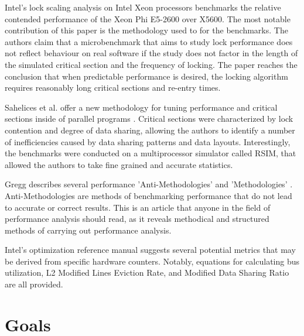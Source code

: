 \documentclass[a4paper, 12pt, titlepage]{article}
\begin{document}
\begin{singlespace}
Intel's lock scaling analysis on Intel Xeon processors \cite{intelxeonlockscaling} benchmarks the relative contended performance of the Xeon Phi E5-2600 over X5600. The most notable contribution of this paper is the methodology used to for the benchmarks. The authors claim that a microbenchmark that aims to study lock performance does not reflect behaviour on real software if the study does not factor in the length of the simulated critical section and the frequency of locking. The paper reaches the conclusion that when predictable performance is desired, the locking algorithm requires reasonably long critical sections and re-entry times.

Sahelices et al. offer a new methodology for tuning performance and critical sections inside of parallel programs \cite{sahelices2009methodology}. Critical sections were characterized by lock contention and degree of data sharing, allowing the authors to identify a number of inefficiencies caused by data sharing patterns and data layouts. Interestingly, the benchmarks were conducted on a multiprocessor simulator called RSIM, that allowed the authors to take fine grained and accurate statistics.

Gregg describes several performance 'Anti-Methodologies' and 'Methodologies' \cite{methodologygregg}. Anti-Methodologies are methods of benchmarking performance that do not lead to accurate or correct results. This is an article that anyone in the field of performance analysis should read, as it reveals methodical and structured methods of carrying out performance analysis.

Intel's optimization reference manual \cite{intelmanualoptimization} suggests several potential metrics that may be derived from specific hardware counters. Notably, equations for calculating bus utilization, L2 Modified Lines Eviction Rate, and Modified Data Sharing Ratio are all provided.

\section{Goals}

\end{singlespace}
\end{document}
